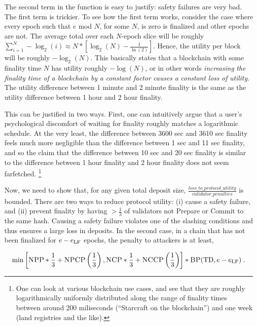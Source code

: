 \documentclass[12pt, final]{article}
\newcommand{\epoch}{\ensuremath{e}\xspace}
\newcommand{\BP}{\textsc{BP}\xspace}
\newcommand{\NCP}{\textsc{NCP}\xspace}
\newcommand{\NCCP}{\textsc{NCCP}\xspace}
\newcommand{\NPP}{\textsc{NPP}\xspace}
\newcommand{\NPCP}{\textsc{NPCP}\xspace}
\newcommand{\totaldeposit}{\textnormal{TD}\xspace}
\newcommand{\epochLF}{\ensuremath{\epoch_{\textnormal{LF}}}\xspace}
\begin{document}
The second term in the function is easy to justify: safety failures are very bad. The first term is trickier. To see how the first term works, consider the case where every epoch such that $\epoch$ mod $N$, for some $N$, is zero is finalized and other epochs are not. The average total over each $N$-epoch slice will be roughly $\sum_{i=1}^N -\log_2(i) \approx N * \left[ \log_2(N) - \frac{1}{\ln(2)} \right]$. Hence, the utility per block will be roughly $-\log_2(N)$. This basically states that a blockchain with some finality time $N$ has utility roughly $-\log(N)$, or in other words \emph{increasing the finality time of a blockchain by a constant factor causes a constant loss of utility}. The utility difference between 1 minute and 2 minute finality is the same as the utility difference between 1 hour and 2 hour finality.

This can be justified in two ways. First, one can intuitively argue that a user's psychological discomfort of waiting for finality roughly matches a logarithmic schedule. At the very least, the difference between 3600 sec and 3610 sec finality feels much more negligible than the difference between 1 sec and 11 sec finality, and so the claim that the difference between 10 sec and 20 sec finality is similar to the difference between 1 hour finality and 2 hour finality does not seem farfetched. \footnote{One can look at various blockchain use cases, and see that they are roughly logarithmically uniformly distributed along the range of finality times between around 200 miliseconds (``Starcraft on the blockchain'') and one week (land registries and the like). }

Now, we need to show that, for any given total deposit size, $\frac{loss\_to\_protocol\_utility}{validator\_penalties}$ is bounded. There are two ways to reduce protocol utility: (i) cause a safety failure, and (ii) prevent finality by having $> \frac{1}{3}$  of validators not Prepare or Commit to the same hash.  Causing a safety failure violates one of the slashing conditions and thus ensures a large loss in deposits.  In the second case, in a chain that has not been finalized for $\epoch - \epochLF$ epochs, the penalty to attackers is at least,

\begin{equation}
\min \left[ \NPP * \frac{1}{3} + \NPCP\left(\frac{1}{3}\right), \NCP * \frac{1}{3} + \NCCP\left(\frac{1}{3}\right) \right] * \BP(\totaldeposit, \epoch - \epochLF) \; .
\end{equation}
\end{document}
